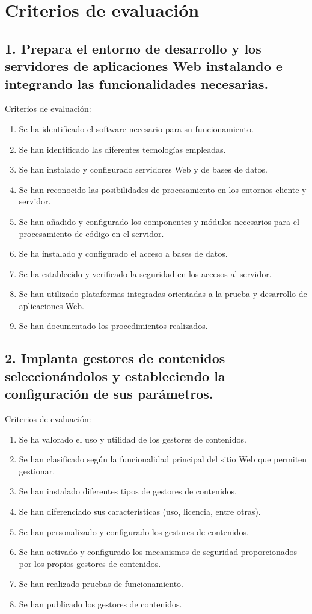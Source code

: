 \documentclass[a4paper]{article}
\begin{document}
\section{Criterios de evaluación}
\label{sec:org0000033}

\subsection{1. Prepara el entorno de desarrollo y los servidores de aplicaciones Web instalando e integrando las funcionalidades necesarias.}
\label{sec:org000001b}
Criterios de evaluación:
\begin{enumerate}
\item Se ha identificado el software necesario para su funcionamiento.
\item Se han identificado las diferentes tecnologías empleadas.
\item Se han instalado y configurado servidores Web y de bases de datos.
\item Se han reconocido las posibilidades de procesamiento en los entornos cliente y servidor.
\item Se han añadido y configurado los componentes y módulos necesarios para el procesamiento de código en el servidor.
\item Se ha instalado y configurado el acceso a bases de datos.
\item Se ha establecido y verificado la seguridad en los accesos al servidor.
\item Se han utilizado plataformas integradas orientadas a la prueba y desarrollo de aplicaciones Web.
\item Se han documentado los procedimientos realizados.
\end{enumerate}
\subsection{2. Implanta gestores de contenidos seleccionándolos y estableciendo la configuración de sus parámetros.}
\label{sec:org000001e}
Criterios de evaluación:
\begin{enumerate}
\item Se ha valorado el uso y utilidad de los gestores de contenidos.
\item Se han clasificado según la funcionalidad principal del sitio Web que permiten gestionar.
\item Se han instalado diferentes tipos de gestores de contenidos.
\item Se han diferenciado sus características (uso, licencia, entre otras).
\item Se han personalizado y configurado los gestores de contenidos.
\item Se han activado y configurado los mecanismos de seguridad proporcionados por los propios gestores de contenidos.
\item Se han realizado pruebas de funcionamiento.
\item Se han publicado los gestores de contenidos.
\end{enumerate}
\end{document}
